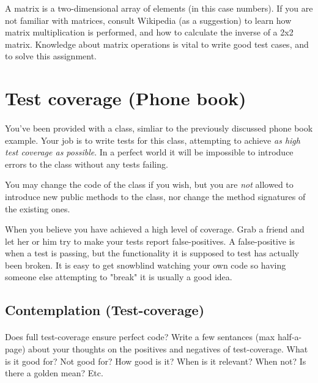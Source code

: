 \documentclass{article}
\begin{document}
      A matrix is a two-dimensional array of elements (in this case numbers). If you are not familiar with matrices, consult Wikipedia (as a suggestion) to learn how matrix multiplication is performed, and how to calculate the inverse of a 2x2 matrix. Knowledge about matrix operations is vital to write good test cases, and to solve this assignment.






\pagebreak
\section{ Test coverage (Phone book) }
  \paragraph{}
    You've been provided with a class, simliar to the previously discussed phone book example. Your job is to write tests for this class, attempting to achieve \emph{as high test coverage as possible}. In a perfect world it will be impossible to introduce errors to the class without any tests failing.

    You may change the code of the class if you wish, but you are \emph{not} allowed to introduce new public methods to the class, nor change the method signatures of the existing ones.

    When you believe you have achieved a high level of coverage. Grab a friend and let her or him try to make your tests report false-positives. A false-positive is when a test is passing, but the functionality it is supposed to test has actually been broken. It is easy to get snowblind watching your own code so having someone else attempting to "break" it is usually a good idea.

\subsection{ Contemplation (Test-coverage) }
  \paragraph{}
    Does full test-coverage ensure perfect code? Write a few sentances (max half-a-page) about your thoughts on the positives and negatives of test-coverage. What is it good for? Not good for? How good is it? When is it relevant? When not? Is there a golden mean? Etc.
\end{document}
